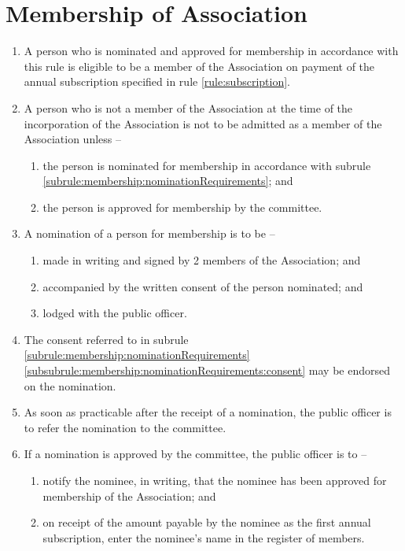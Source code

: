 \section{Membership of Association}
\label{rule:membership}

\begin{enumerate}
	\item A person who is nominated and approved for membership in accordance with this rule is eligible to be a member of the Association on payment of the annual subscription specified in rule \ref{rule:subscription}.
	
	\item A person who is not a member of the Association at the time of the incorporation of the Association is not to be admitted as a member of the Association unless --
	\begin{enumerate}
		\item the person is nominated for membership in accordance with subrule \ref{subrule:membership:nominationRequirements}; and
		\item the person is approved for membership by the committee.
	\end{enumerate}
	
	\item \label{subrule:membership:nominationRequirements} A nomination of a person for membership is to be --
	\begin{enumerate}
		\item made in writing and signed by 2 members of the Association; and
		\item \label{subsubrule:membership:nominationRequirements:consent} accompanied by the written consent of the person nominated; and
		\item lodged with the public officer.
	\end{enumerate}
	
	\item The consent referred to in subrule \ref{subrule:membership:nominationRequirements}\ref{subsubrule:membership:nominationRequirements:consent} may be endorsed on the nomination.
	\item As soon as practicable after the receipt of a nomination, the public officer is to refer the nomination to the committee.
	
	\item If a nomination is approved by the committee, the public officer is to --
	\begin{enumerate}
		\item notify the nominee, in writing, that the nominee has been approved for membership of the Association; and
		\item on receipt of the amount payable by the nominee as the first annual subscription, enter the nominee's name in the register of members.
	\end{enumerate}
	

\end{enumerate}

